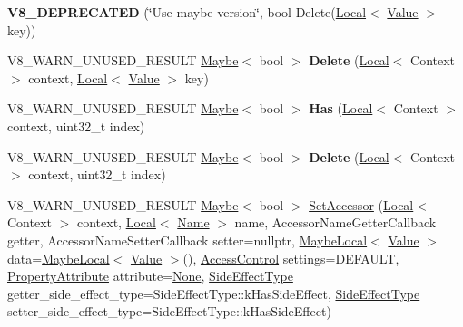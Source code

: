 \begin{DoxyCompactItemize}
\item 
\mbox{\label{classv8_1_1Object_a1c2f3c464d543c4cf26a391adc34c98a}} 
{\bfseries V8\+\_\+\+D\+E\+P\+R\+E\+C\+A\+T\+ED} (\char`\"{}Use maybe version\char`\"{}, bool Delete(\mbox{\hyperlink{classv8_1_1Local}{Local}}$<$ \mbox{\hyperlink{classv8_1_1Value}{Value}} $>$ key))
\item 
\mbox{\label{classv8_1_1Object_abef69eff95cf01271a45cf4ccb9db599}} 
V8\+\_\+\+W\+A\+R\+N\+\_\+\+U\+N\+U\+S\+E\+D\+\_\+\+R\+E\+S\+U\+LT \mbox{\hyperlink{classv8_1_1Maybe}{Maybe}}$<$ bool $>$ {\bfseries Delete} (\mbox{\hyperlink{classv8_1_1Local}{Local}}$<$ Context $>$ context, \mbox{\hyperlink{classv8_1_1Local}{Local}}$<$ \mbox{\hyperlink{classv8_1_1Value}{Value}} $>$ key)
\item 
\mbox{\label{classv8_1_1Object_adfbff82d3a45a69415ae99013a654daa}} 
V8\+\_\+\+W\+A\+R\+N\+\_\+\+U\+N\+U\+S\+E\+D\+\_\+\+R\+E\+S\+U\+LT \mbox{\hyperlink{classv8_1_1Maybe}{Maybe}}$<$ bool $>$ {\bfseries Has} (\mbox{\hyperlink{classv8_1_1Local}{Local}}$<$ Context $>$ context, uint32\+\_\+t index)
\item 
\mbox{\label{classv8_1_1Object_ac4acbd87ab5773845ec5be1737b6a2bb}} 
V8\+\_\+\+W\+A\+R\+N\+\_\+\+U\+N\+U\+S\+E\+D\+\_\+\+R\+E\+S\+U\+LT \mbox{\hyperlink{classv8_1_1Maybe}{Maybe}}$<$ bool $>$ {\bfseries Delete} (\mbox{\hyperlink{classv8_1_1Local}{Local}}$<$ Context $>$ context, uint32\+\_\+t index)
\item 
V8\+\_\+\+W\+A\+R\+N\+\_\+\+U\+N\+U\+S\+E\+D\+\_\+\+R\+E\+S\+U\+LT \mbox{\hyperlink{classv8_1_1Maybe}{Maybe}}$<$ bool $>$ \mbox{\hyperlink{classv8_1_1Object_a064c7ba0abe1237086af4201b505f91e}{Set\+Accessor}} (\mbox{\hyperlink{classv8_1_1Local}{Local}}$<$ Context $>$ context, \mbox{\hyperlink{classv8_1_1Local}{Local}}$<$ \mbox{\hyperlink{classv8_1_1Name}{Name}} $>$ name, Accessor\+Name\+Getter\+Callback getter, Accessor\+Name\+Setter\+Callback setter=nullptr, \mbox{\hyperlink{classv8_1_1MaybeLocal}{Maybe\+Local}}$<$ \mbox{\hyperlink{classv8_1_1Value}{Value}} $>$ data=\mbox{\hyperlink{classv8_1_1MaybeLocal}{Maybe\+Local}}$<$ \mbox{\hyperlink{classv8_1_1Value}{Value}} $>$(), \mbox{\hyperlink{namespacev8_a31d8355cb043d7d2dda3f4a52760b64e}{Access\+Control}} settings=D\+E\+F\+A\+U\+LT, \mbox{\hyperlink{namespacev8_a05f25f935e108a1ea2d150e274602b87}{Property\+Attribute}} attribute=\mbox{\hyperlink{namespacev8_a05f25f935e108a1ea2d150e274602b87a7ab4d58719c33b3ea2dfaefa29b111df}{None}}, \mbox{\hyperlink{namespacev8_a29711319c2b9fc7716d65faee2f7b9cb}{Side\+Effect\+Type}} getter\+\_\+side\+\_\+effect\+\_\+type=Side\+Effect\+Type\+::k\+Has\+Side\+Effect, \mbox{\hyperlink{namespacev8_a29711319c2b9fc7716d65faee2f7b9cb}{Side\+Effect\+Type}} setter\+\_\+side\+\_\+effect\+\_\+type=Side\+Effect\+Type\+::k\+Has\+Side\+Effect)

\end{DoxyCompactItemize}
